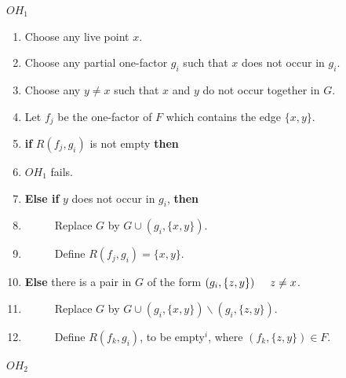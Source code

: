 \documentclass[
  12pt,
  a4paper]{book}
\begin{document}
\(OH_1\)

\begin{enumerate}
\def\labelenumi{\arabic{enumi}.}
\item
  Choose any live point \(x\).
\item
  Choose any partial one-factor \(g_i\) such that \(x\) does not occur
  in \(g_i\).
\item
  Choose any \(y \neq x\) such that \(x\) and \(y\) do not occur
  together in \(G\).
\item
  Let \(f_j\) be the one-factor of \(F\) which contains the edge
  \(\{x,y\}\).
\item
  \textbf{if} \(R(f_j,g_i)\) is not empty \textbf{then}
\item
  \(OH_1\) fails.
\item
  \textbf{Else if} \(y\) does not occur in \(g_i\), \textbf{then}
\item
  \(\hspace{1cm}\) Replace \(G\) by \(G \cup (g_i,\{x,y\})\).
\item
  \(\hspace{1cm}\) Define \(R(f_j,g_i)=\{x,y\}\).
\item
  \textbf{Else} there is a pair in \(G\) of the form
  \((g_i,\{z,y\}) \hspace{0.5cm} z \neq x\).
\item
  \(\hspace{1cm}\) Replace \(G\) by
  \(G \cup (g_i,\{x,y\}) \backslash (g_i,\{z,y\})\).
\item
  \(\hspace{1cm}\) Define \(R(f_k,g_i)\), to be empty\(^i\), where
  \((f_k,\{z,y\}) \in F\).
\end{enumerate}

\(OH_2\)
\end{document}

